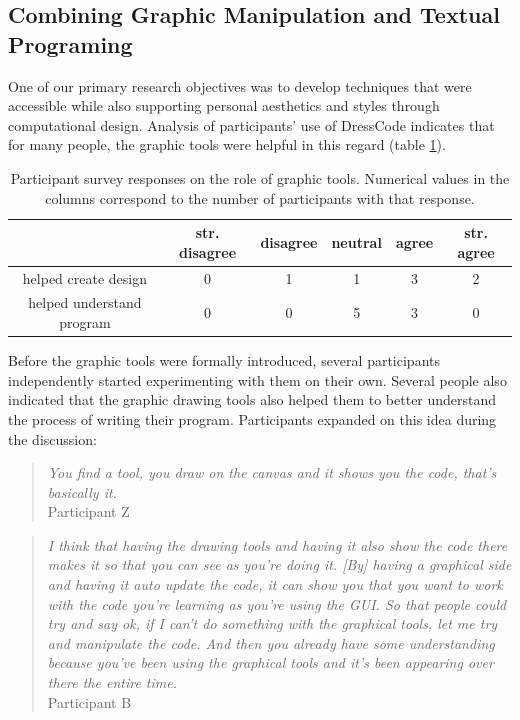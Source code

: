 \documentclass{sigchi}
\newcommand\tabhead[1]{\small\textbf{#1}}
\begin{document}
\subsection{Combining Graphic Manipulation and Textual Programing}
	One of our primary research objectives was to develop techniques that were accessible while also supporting personal aesthetics and styles through computational design. Analysis of participants' use of DressCode indicates that for many people, the graphic tools were helpful in this regard (table \ref{table:graphic_tools}). 

\begin{table}
  \centering
  \begin{tabular}{|c|c|c|c|c|c|}
    \hline
    \multicolumn{1}{|p{0.75cm}|}{\centering\tabhead{}} &
    \multicolumn{1}{|p{1cm}|}{\centering\small{str. disagree}} &
    \multicolumn{1}{|p{0.8cm}|}{\centering\small{disagree}}&
    \multicolumn{1}{|p{0.8cm}|}{\centering\small{neutral}}&
    \multicolumn{1}{|p{0.8cm}|}{\centering\small{agree}}&
    \multicolumn{1}{|p{0.8cm}|}{\centering\small{str. agree}}\\
    \hline
    \small{helped create design} & 0 & 1 & 1 & 3 & 2 \\
    \hline
    \small{helped understand program} & 0 & 0 & 5 & 3& 0  \\
    \hline
  \end{tabular}
  \caption{Participant survey responses on the role of graphic tools. Numerical values in the columns correspond to the number of participants with that response.}
\label{table:graphic_tools}
\end{table}

Before the graphic tools were formally introduced, several participants independently started experimenting with them on their own. Several people also indicated that the graphic drawing tools also helped them to better understand the process of writing their program. Participants expanded on this idea during the discussion:
\begin{quotation}
\textit{You find a tool, you draw on the canvas and it shows you the code, that's basically it.}
\\Participant Z
\end{quotation}

\begin{quotation}
\textit{I think that having the drawing tools and having it also show the code there makes it so that you can see as you're doing it. [By] having a graphical side and having it auto update the code, it can show you that you want to work with the code you're learning as you're using the GUI. So that people could try and say ok, if I can't do something with the graphical tools, let me try and manipulate the code. And then you already have some understanding because you've been using the graphical tools and it's been appearing over there the entire time.}
\\Participant B
\end{quotation}
\end{document}
